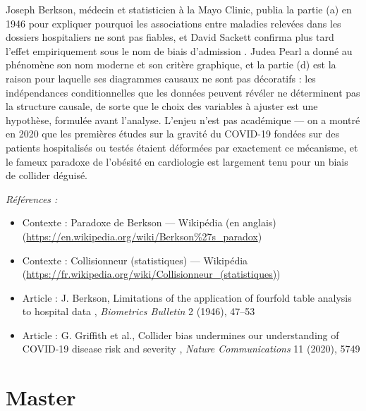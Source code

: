 \documentclass[11pt]{article}
\newenvironment{refs}{\par\small\noindent\emph{Références :}\begin{itemize}\setlength\itemsep{0pt}}{\end{itemize}\normalsize}
\begin{document}
\noindent Joseph Berkson, médecin et statisticien à la Mayo Clinic, publia la partie (a)
en 1946 pour expliquer pourquoi les associations entre maladies relevées dans les dossiers
hospitaliers ne sont pas fiables, et David Sackett confirma plus tard l'effet empiriquement sous le
nom de \og{} biais d'admission \fg{}. Judea Pearl a donné au phénomène son nom moderne et son critère
graphique, et la partie (d) est la raison pour laquelle ses diagrammes causaux ne sont pas
décoratifs : les indépendances conditionnelles que les données peuvent révéler ne déterminent pas
la structure causale, de sorte que le choix des variables à ajuster est une hypothèse, formulée
avant l'analyse. L'enjeu n'est pas académique --- on a montré en 2020 que les premières études sur la
gravité du COVID-19 fondées sur des patients hospitalisés ou testés étaient déformées par exactement
ce mécanisme, et le fameux \og{} paradoxe de l'obésité \fg{} en cardiologie est largement tenu pour un biais
de collider déguisé.

\begin{refs}
\item Contexte : Paradoxe de Berkson --- Wikipédia (en anglais) (\url{https://en.wikipedia.org/wiki/Berkson%27s_paradox})
\item Contexte : Collisionneur (statistiques) --- Wikipédia (\url{https://fr.wikipedia.org/wiki/Collisionneur_(statistiques)})
\item Article : J. Berkson, \og{} Limitations of the application of fourfold table analysis to hospital data \fg{}, \textit{Biometrics Bulletin} 2 (1946), 47--53
\item Article : G. Griffith et al., \og{} Collider bias undermines our understanding of COVID-19 disease risk and severity \fg{}, \textit{Nature Communications} 11 (2020), 5749
\end{refs}

\bigskip


\section*{Master}
\end{document}
